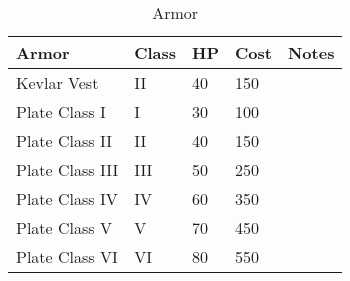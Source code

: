 \begin{table}
  \caption{Armor}
  \begin{center}
    \begin{tabular}{| l | l | l | l | l |}

      \hline
      \textbf{Armor} & \textbf{Class} & \textbf{HP} &
      \textbf{Cost} & \textbf{Notes} \\ \hline

      Kevlar Vest     &  II & 40 & 150 & \\ \hline
      Plate Class I   &   I & 30 & 100 & \\ \hline
      Plate Class II  &  II & 40 & 150 & \\ \hline
      Plate Class III & III & 50 & 250 & \\ \hline
      Plate Class IV  &  IV & 60 & 350 & \\ \hline
      Plate Class V   &   V & 70 & 450 & \\ \hline
      Plate Class VI  &  VI & 80 & 550 & \\ \hline

    \end{tabular}
  \end{center}
\end{table}
